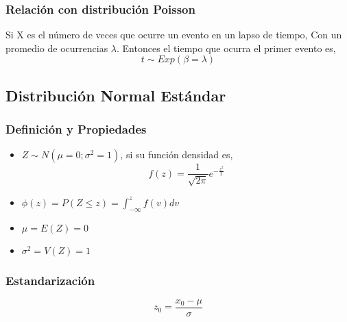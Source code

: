 \documentclass{article}
\begin{document}
\subsubsection*{Relación con distribución Poisson}
Si X es el número de veces que ocurre un evento en un lapso de tiempo, Con un promedio de ocurrencias $\lambda$. Entonces el tiempo que ocurra el primer evento es,
\[ t\sim Exp(\beta=\lambda) \]

\subsection{Distribución Normal Estándar}
\subsubsection*{Definición y Propiedades}
\begin{itemize}
    \item $Z\sim N(\mu=0;\sigma^{2}=1)$, si su función densidad es,
        \[f(z)=\frac{1}{\sqrt{2\pi}}e^{-\frac{z^{2}}{2}}\]
    \item $\phi(z)=P(Z\leq z)=\int^{z}_{-\infty}f(v)dv$
    \item $\mu=E(Z)=0$
    \item $\sigma^{2}=V(Z)=1$
\end{itemize}
\subsubsection*{Estandarización}
\[z_{0}=\frac{x_{0}-\mu}{\sigma}\]
\end{document}
